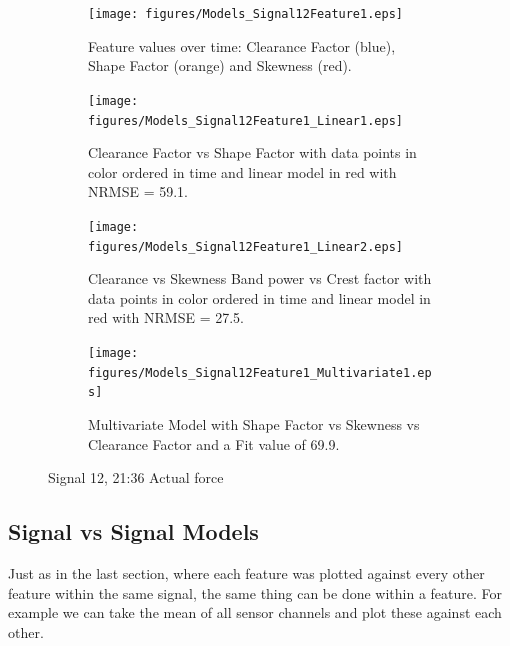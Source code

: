 \documentclass[]{article}
\begin{document}
\begin{figure}[H]
	\captionsetup[subfigure]{}
    \centering
    
		\begin{subfigure}[t]{.45\textwidth}
		  \centering
    			\texttt{[image: figures/Models\_Signal12Feature1.eps]}
		  	\caption{Feature values over time: Clearance Factor (blue), Shape Factor (orange) and Skewness (red).}
		  	\label{fig:Models_Signal12Feature1}
		\end{subfigure}
		\hspace*{\fill}%
		\begin{subfigure}[t]{.45\textwidth}
		  \centering
 		   	\texttt{[image: figures/Models\_Signal12Feature1\_Linear1.eps]}
		  	\caption{Clearance Factor vs Shape Factor with data points in color ordered in time and linear model in red with \gls{NRMSE} = 59.1.}
		  	\label{fig:Models_Signal12Feature1_Linear1}
		\end{subfigure}
		\bigskip
		\begin{subfigure}[t]{.45\textwidth}
		  \centering
 		   	\texttt{[image: figures/Models\_Signal12Feature1\_Linear2.eps]}
		  	\caption{Clearance vs Skewness Band power vs Crest factor with data points in color ordered in time and linear model in red with \gls{NRMSE} = 27.5.}
		  	\label{fig:Models_Signal12Feature1_Linear2}
		\end{subfigure}
		\hspace*{\fill}%
		\begin{subfigure}[t]{.45\textwidth}
		  \centering
 		   	\texttt{[image: figures/Models\_Signal12Feature1\_Multivariate1.eps]}
		  	\caption{Multivariate Model with Shape Factor vs Skewness vs Clearance Factor and a Fit value of 69.9.}
		  	\label{fig:Models_Signal12Feature1_Multivariate1}
		\end{subfigure}
		
    \caption{Signal 12, 21:36 Actual force}
    \label{fig:Models_Signal12Feature1_Caption}
\end{figure}



\subsection{Signal vs Signal Models}
Just as in the last section, where each feature was plotted against every other feature within the same signal, the same thing can be done within a feature. For example we can take the mean of all sensor channels and plot these against each other.
\end{document}
